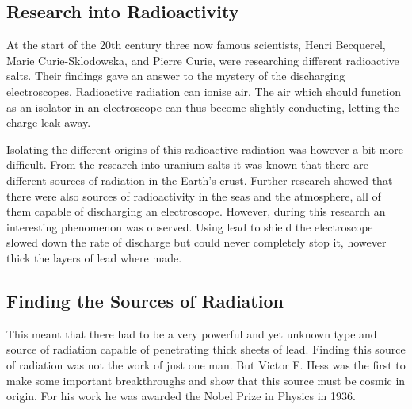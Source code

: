 \documentclass[12pt,a4paper]{article}
\numberwithin{equation}{section}
\numberwithin{figure}{section}
\numberwithin{table}{section}
\begin{document}
\subsection{Research into Radioactivity}
At the start of the 20th century three now famous scientists, Henri Becquerel, Marie Curie-Sklodowska, and Pierre Curie, were researching different radioactive salts. Their findings gave an answer to the mystery of the discharging electroscopes. Radioactive radiation can ionise air. The air which should function as an isolator in an electroscope can thus become slightly conducting, letting the charge leak away.

Isolating the different origins of this radioactive radiation was however a bit more difficult. From the research into uranium salts it was known that there are different sources of radiation in the Earth's crust. Further research showed that there were also sources of radioactivity in the seas and the atmosphere, all of them capable of discharging an electroscope. However, during this research an interesting phenomenon was observed. Using lead to shield the electroscope slowed down the rate of discharge but could never completely stop it, however thick the layers of lead where made.

\subsection{Finding the Sources of Radiation}
This meant that there had to be a very powerful and yet unknown type and source of radiation capable of penetrating thick sheets of lead. Finding this source of radiation was not the work of just one man. But Victor F. Hess was the first to make some important breakthroughs and show that this source must be cosmic in origin. For his work he was awarded the Nobel Prize in Physics in 1936.
\end{document}
